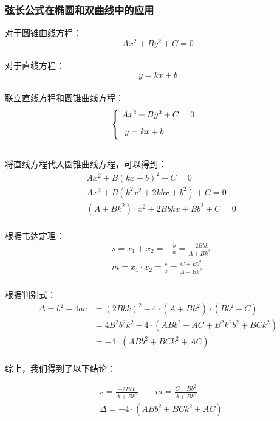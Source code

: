 \documentclass[UTF8]{ctexart}
\begin{document}
\subsubsection{弦长公式在椭圆和双曲线中的应用}
    对于圆锥曲线方程：
    \setcounter{equation}{0}
    \begin{equation}
        Ax^2+By^2+C=0
    \end{equation}\\
    对于直线方程：
    \begin{equation}
        y=kx+b
    \end{equation}\\
    联立直线方程和圆锥曲线方程：
    \begin{equation}
        \begin{cases}
            \ Ax^2+By^2+C=0\\[2mm]
            \ ~y=kx+b\vspace{3pt}
        \end{cases}
    \end{equation}\\[1mm]
    将直线方程代入圆锥曲线方程，可以得到：
    \begin{align}
        &Ax^2+B(kx+b)^2+C=0\\[3mm]
        &Ax^2+B(k^2x^2+2kbx+b^2)+C=0\\[3mm]
        &(A+Bk^2)\cdot x^2+2Bbkx+Bb^2+C=0
    \end{align}\\
    根据韦达定理：
    \begin{align}
        &s=x_1+x_2=-\frac{b}{a}=\frac{-2Bbk}{A+Bk^2}\\[4mm]
        &m=x_1\cdot x_2=\frac{c}{a}=\frac{C+Bb^2}{A+Bk^2}
    \end{align}\\
    根据判别式：
    \begin{align}
        \Delta=b^2-4ac&=(2Bbk)^2-4\cdot\left(A+Bk^2\right)\cdot\left(Bb^2+C\right)\\[3mm]
        &=4B^2b^2k^2-4\cdot\left(ABb^2+AC+B^2k^2b^2+BCk^2\right)\\[3mm]
        &=-4\cdot\left(ABb^2+BCk^2+AC\right)
    \end{align}\\
    综上，我们得到了以下结论：
    \begin{large}
        \begin{align}
            &s=\frac{-2Bbk}{A+Bk^2}\qquad m=\frac{C+Bb^2}{A+Bk^2}\\[4mm]
            &\Delta=-4\cdot\left(ABb^2+BCk^2+AC\right)
        \end{align}
    \end{large}
\end{document}
